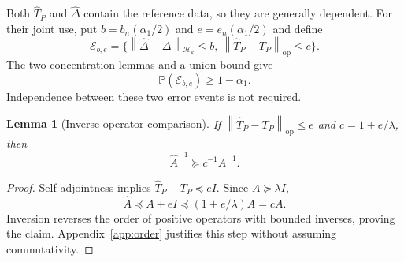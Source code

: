\documentclass[11pt,a4paper]{article}
\newtheorem{lemma}[theorem]{Lemma}
\theoremstyle{definition}
\theoremstyle{remark}
\newcommand{\HH}{\mathcal H_k}
\newcommand{\Prob}{\mathbb P}
\newcommand{\norm}[1]{\left\lVert#1\right\rVert}
\newcommand{\op}{\mathrm{op}}
\begin{document}
Both $\widehat T_P$ and $\widehat\Delta$ contain the reference data,
so they are generally dependent. For their joint use, put
$b=b_n(\alpha_1/2)$ and $e=e_n(\alpha_1/2)$ and define
\begin{equation}\label{eq:joint-event}
 \mathcal E_{b,e}=
 \{\norm{\widehat\Delta-\Delta}_{\HH}\le b,
   \ \norm{\widehat T_P-T_P}_{\op}\le e\}.
\end{equation}
The two concentration lemmas and a union bound give
\begin{equation}\label{eq:joint-probability}
 \Prob(\mathcal E_{b,e})\ge1-\alpha_1.
\end{equation}
Independence between these two error events is not required.

\begin{lemma}[Inverse-operator comparison]\label{lem:inverse}
If $\norm{\widehat T_P-T_P}_{\op}\le e$ and $c=1+e/\lambda$, then
\begin{equation}\label{eq:inverse-order}
 \widehat A^{-1}\succeq c^{-1}A^{-1}.
\end{equation}
\end{lemma}
\begin{proof}
Self-adjointness implies $\widehat T_P-T_P\preceq eI$.
Since $A\succeq\lambda I$,
\[
 \widehat A\preceq A+eI\preceq(1+e/\lambda)A=cA.
\]
Inversion reverses the order of positive operators with bounded
inverses, proving the claim. Appendix~\ref{app:order} justifies this
step without assuming commutativity.
\end{proof}
\end{document}
